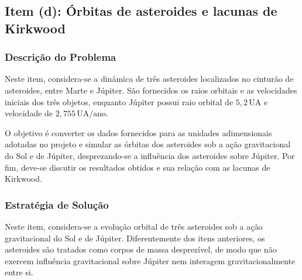 \documentclass[12pt,a4paper]{article}
\begin{document}
\subsection{Item (d): Órbitas de asteroides e lacunas de Kirkwood}

\subsubsection{Descrição do Problema}

Neste item, considera-se a dinâmica de três asteroides localizados no cinturão de asteroides, entre Marte e Júpiter. São fornecidos os raios orbitais e as velocidades iniciais dos três objetos, enquanto Júpiter possui raio orbital de $5{,}2\,\mathrm{UA}$ e velocidade de $2{,}755\,\mathrm{UA/ano}$.

O objetivo é converter os dados fornecidos para as unidades adimensionais adotadas no projeto e simular as órbitas dos asteroides sob a ação gravitacional do Sol e de Júpiter, desprezando-se a influência dos asteroides sobre Júpiter. Por fim, deve-se discutir os resultados obtidos e sua relação com as lacunas de Kirkwood.

\subsubsection{Estratégia de Solução}

Neste item, considera-se a evolução orbital de três asteroides sob a ação gravitacional do Sol e de Júpiter. Diferentemente dos itens anteriores, os asteroides são tratados como corpos de massa desprezível, de modo que não exercem influência gravitacional sobre Júpiter nem interagem gravitacionalmente entre si.
\end{document}

